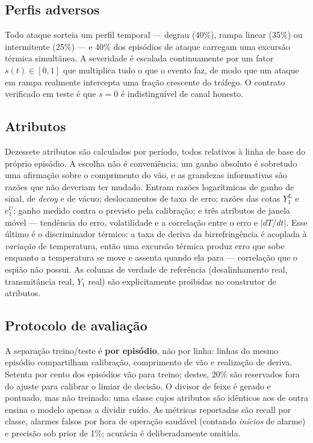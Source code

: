\documentclass[12pt]{article}
\begin{document}
\subsection{Perfis adversos}

Todo ataque sorteia um perfil temporal --- degrau (40\%), rampa linear (35\%) ou
intermitente (25\%) --- e 40\% dos episódios de ataque carregam uma excursão
térmica simultânea. A severidade é escalada continuamente por um fator
$s(t) \in [0,1]$ que multiplica tudo o que o evento faz, de modo que um ataque em
rampa realmente intercepta uma fração crescente do tráfego. O contrato verificado
em teste é que $s=0$ é indistinguível de canal honesto.

\subsection{Atributos}

Dezessete atributos são calculados por período, todos relativos à linha de base do
próprio episódio. A escolha não é conveniência: um ganho absoluto é sobretudo uma
afirmação sobre o comprimento do vão, e as grandezas informativas são razões que
não deveriam ter mudado. Entram razões logarítmicas de ganho de sinal, de
\emph{decoy} e de vácuo; deslocamentos de taxa de erro; razões das cotas $Y_1^L$ e
$e_1^U$; ganho medido contra o previsto pela calibração; e três atributos de
janela móvel --- tendência do erro, volatilidade e a correlação entre o erro e
$|dT/dt|$. Esse último é o discriminador térmico: a taxa de deriva da
birrefringência é acoplada à \emph{variação} de temperatura, então uma excursão
térmica produz erro que sobe enquanto a temperatura se move e assenta quando ela
para --- correlação que o espião não possui. As colunas de verdade de referência
(desalinhamento real, transmitância real, $Y_1$ real) são explicitamente proibidas
no construtor de atributos.

\subsection{Protocolo de avaliação}

A separação treino/teste é \textbf{por episódio}, não por linha: linhas do mesmo
episódio compartilham calibração, comprimento de vão e realização de deriva.
Setenta por cento dos episódios vão para treino; destes, 20\% são reservados fora
do ajuste para calibrar o limiar de decisão. O divisor de feixe é gerado e
pontuado, mas não treinado: uma classe cujos atributos são idênticos aos de outra
ensina o modelo apenas a dividir ruído. As métricas reportadas são recall por
classe, alarmes falsos por hora de operação saudável (contando \emph{inícios} de
alarme) e precisão sob prior de 1\%; acurácia é deliberadamente omitida.
\end{document}
